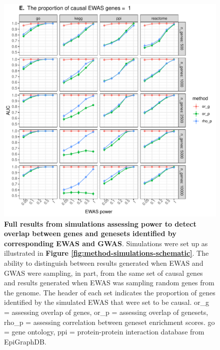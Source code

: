\documentclass[11pt,twoside]{bristolthesis}
\begin{document}
\begin{figure}

{\centering \includegraphics[width=1\linewidth]{figure/06-ewas_gwas_comparison/method_test_gene_up_all/PEC_1} 

}

\caption[Full results from simulations assessing power to detect overlap between genes and genesets identified by corresponding EWAS and GWAS]{\textbf{Full results from simulations assessing power to detect overlap between genes and genesets identified by corresponding EWAS and GWAS}. Simulations were set up as illustrated in \textbf{Figure \ref{fig:method-simulations-schematic}}. The ability to distinguish between results generated when EWAS and GWAS were sampling, in part, from the same set of causal genes and results generated when EWAS was sampling random genes from the genome. The header of each set indicates the proportion of genes identified by the simulated EWAS that were set to be causal. or\_g = assessing overlap of genes, or\_p = assessing overlap of genesets, rho\_p = assessing correlation between geneset enrichment scores. go = gene ontology, ppi = protein-protein interaction database from EpiGraphDB.}\label{fig:sim1-full-plot5}
\end{figure}
\end{document}
